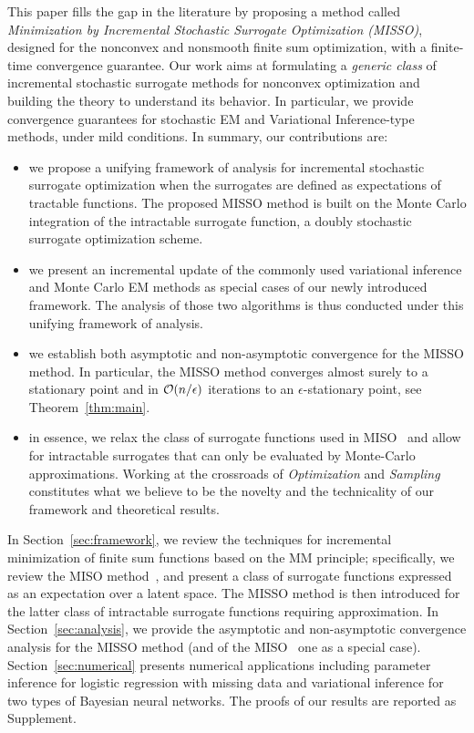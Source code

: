 \documentclass{article}
\begin{document}
This paper fills the gap in the literature by proposing a  method called \emph{Minimization by Incremental Stochastic Surrogate Optimization (MISSO)}, designed for the nonconvex and nonsmooth finite sum optimization, with a finite-time convergence guarantee.
Our work aims at formulating  a \textit{generic class} of incremental stochastic surrogate methods for nonconvex optimization and building the theory to understand its behavior. 
In particular, we provide convergence guarantees for stochastic EM and Variational Inference-type methods, under mild conditions. In summary, our contributions are:
\begin{itemize}
\item we propose a unifying framework of analysis for incremental stochastic surrogate optimization when the surrogates are defined as expectations of tractable functions. The proposed  MISSO method is built on the Monte Carlo integration of the intractable surrogate function, \ie a doubly stochastic surrogate optimization scheme.
\item we present an incremental update of the commonly used variational inference and Monte Carlo EM methods as special cases of our newly introduced framework. The analysis of those two algorithms is thus conducted under this unifying framework of analysis.
\item we establish both asymptotic and non-asymptotic convergence for the  MISSO method. In particular, the MISSO method converges almost surely to a stationary point and in ${\cal O} (n/\epsilon)$ iterations to an $\epsilon$-stationary point, see Theorem~\ref{thm:main}.
\item in essence, we relax the class of surrogate functions used in MISO~\cite{mairal2015miso} and allow for intractable surrogates that can only be evaluated by Monte-Carlo approximations. Working at the crossroads of \emph{Optimization} and \emph{Sampling} constitutes what we believe to be the novelty and the technicality of our framework and theoretical results.
\end{itemize}

In Section~\ref{sec:framework}, we review the techniques for incremental minimization of finite sum functions based on the MM principle; specifically, we review the MISO method~\cite{mairal2015miso}, 
and present a class of  surrogate functions expressed as an expectation over a latent space. 
The MISSO method is then introduced for the latter class of intractable surrogate functions requiring approximation.
In Section~\ref{sec:analysis}, we provide the asymptotic and non-asymptotic convergence analysis for the MISSO method (and of the MISO~\cite{mairal2015miso} one as a special case).
 Section~\ref{sec:numerical} presents numerical applications  including parameter inference for logistic regression with missing data and variational inference for two types of Bayesian neural networks.
The proofs of our results are reported as Supplement.
\end{document}
